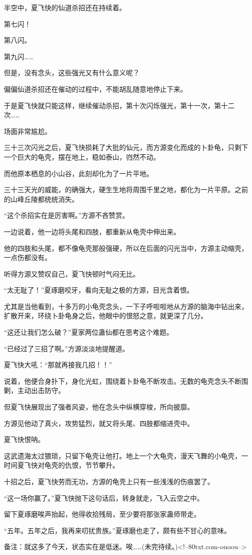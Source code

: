 \begin{this_body}
半空中，夏飞快的仙道杀招还在持续着。

第七闪！

第八闪。

第九闪……

但是，没有念头，这些强光又有什么意义呢？

偏偏仙道杀招还在催动的过程中，不能胡乱随意地停止下来。

于是夏飞快就只能这样，继续催动杀招，第十次闪烁强光，第十一次，第十二次……

场面非常尴尬。

三十三次闪光之后，夏飞快损耗了大批的仙元，而方源变化而成的卜卦龟，只剩下一个巨大的龟壳，摆在地上，稳如泰山，岿然不动。

而他原本栖息的小山谷，此刻却化为了一片平地。

三十三天光的威能，的确强大，硬生生地将周围千里之地，都化为一片平原。之前的山峰丘陵都统统消失。

“这个杀招实在是厉害啊。”方源不吝赞赏。

一边说着，他一边将头尾和四肢，都重新从龟壳中伸出来。

他的四肢和头尾，都不像龟壳那般强硬，所以在后面的闪光当中，方源主动缩壳，一点伤都没有。

听得方源又赞叹自己，夏飞快顿时气闷无比。

“太无耻了！”夏琢磨咬牙，看向无耻之极的方源，目光含着恨。

尤其是当他看到，十多万的小龟壳念头，一下子呼啦啦地从方源的脑海中钻出来，扩散开来，环绕卜卦龟身之后，他眼中的恨怒之意，就更深了几分。

“这还让我们怎么破？”夏家两位蛊仙都在思考这个难题。

“已经过了三招了啊。”方源淡淡地提醒道。

夏飞快大吼：“那就再接我几招！！”

说着，他便合身扑下，身化光虹，围绕着卜卦龟不断攻击。无数的龟壳念头不断围剿，主动出击防守。

但夏飞快展现出了强者风姿，他在念头中纵横穿梭，所向披靡。

方源见他动了真火，攻势猛烈，就又将头尾、四肢都缩进壳中。

夏飞快恨呐。

这武遗海太过猥琐，只留下龟壳让他打。地上一个大龟壳，漫天飞舞的小龟壳，一时间夏飞快对龟壳的仇恨，节节攀升。

十招之后，夏飞快劳而无功，方源的龟壳上只有一些浅浅的伤痕罢了。

“这一场你赢了。”夏飞快抛下这句话后，转身就走，飞入云空之中。

留下夏琢磨唉声抬起，他得收拾残局，至少要将那张家蛊师带走。

“五年。五年之后，我再来叨扰贵族。”夏琢磨也走了，颇有些不甘心的意味。

备注：就这多了今天，状态实在是低迷。唉……(未完待续。)<!--80txt.com-ouoou-->

\end{this_body}

